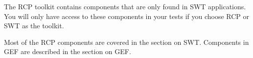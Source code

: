 
The RCP toolkit contains components that are only found in SWT applications. You will only have access to these components in your tests if you choose RCP or SWT as the \gdproject{} toolkit. 

Most of the RCP components are covered in the section on SWT. Components in GEF \gdauts{} are described in the section on GEF.  
